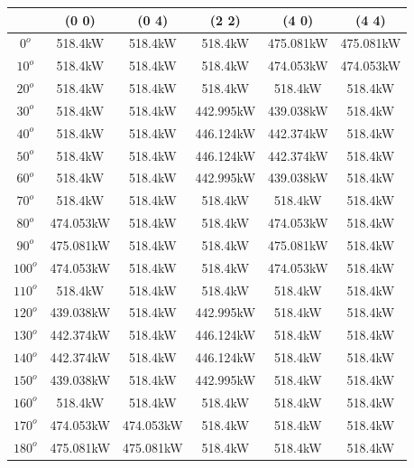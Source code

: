         \singlespacing
        \begin{table}[H]
        	\centering
        	\begin{tabular}{|c|c|c|c|c|c|} \hline
        			& (0 0)		& (0 4)		& (2 2)		& (4 0)		& (4 4)		\\ \hline
        		$0^o$	& 518.4kW	& 518.4kW	& 518.4kW	& 475.081kW	& 475.081kW	\\ \hline
        		$10^o$	& 518.4kW	& 518.4kW	& 518.4kW	& 474.053kW	& 474.053kW	\\ \hline
        		$20^o$	& 518.4kW	& 518.4kW	& 518.4kW	& 518.4kW	& 518.4kW	\\ \hline
        		$30^o$	& 518.4kW	& 518.4kW	& 442.995kW	& 439.038kW	& 518.4kW	\\ \hline
        		$40^o$	& 518.4kW	& 518.4kW	& 446.124kW	& 442.374kW	& 518.4kW	\\ \hline
        		$50^o$	& 518.4kW	& 518.4kW	& 446.124kW	& 442.374kW	& 518.4kW	\\ \hline
        		$60^o$	& 518.4kW	& 518.4kW	& 442.995kW	& 439.038kW	& 518.4kW	\\ \hline
        		$70^o$	& 518.4kW	& 518.4kW	& 518.4kW	& 518.4kW	& 518.4kW	\\ \hline
        		$80^o$	& 474.053kW	& 518.4kW	& 518.4kW	& 474.053kW	& 518.4kW	\\ \hline
        		$90^o$	& 475.081kW	& 518.4kW	& 518.4kW	& 475.081kW	& 518.4kW	\\ \hline
        		$100^o$	& 474.053kW	& 518.4kW	& 518.4kW	& 474.053kW	& 518.4kW	\\ \hline
        		$110^o$	& 518.4kW	& 518.4kW	& 518.4kW	& 518.4kW	& 518.4kW	\\ \hline
        		$120^o$	& 439.038kW	& 518.4kW	& 442.995kW	& 518.4kW	& 518.4kW	\\ \hline
        		$130^o$	& 442.374kW	& 518.4kW	& 446.124kW	& 518.4kW	& 518.4kW	\\ \hline
        		$140^o$	& 442.374kW	& 518.4kW	& 446.124kW	& 518.4kW	& 518.4kW	\\ \hline
        		$150^o$	& 439.038kW	& 518.4kW	& 442.995kW	& 518.4kW	& 518.4kW	\\ \hline
        		$160^o$	& 518.4kW	& 518.4kW	& 518.4kW	& 518.4kW	& 518.4kW	\\ \hline
        		$170^o$	& 474.053kW	& 474.053kW	& 518.4kW	& 518.4kW	& 518.4kW	\\ \hline
        		$180^o$	& 475.081kW	& 475.081kW	& 518.4kW	& 518.4kW	& 518.4kW	\\ \hline

\end{tabular}
\end{table}
